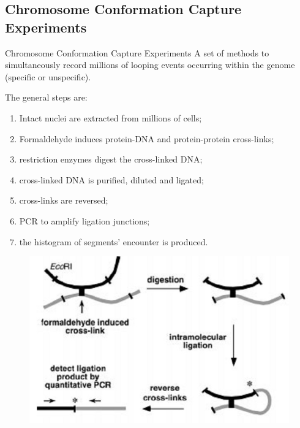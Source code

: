\documentclass[8pt]{beamer}
\begin{document}
\subsection{Chromosome Conformation Capture Experiments}\label{subsection_chromosomeConformationCaptureExperiments}
\begin{frame}{Chromosome Conformation Capture Experiments}
A set of methods to simultaneously record millions of looping events occurring within the genome (specific or unspecific). 

The general steps are:
\begin{enumerate}
\item Intact nuclei are extracted from millions of cells;
\item Formaldehyde induces protein-DNA and protein-protein cross-links;
\item restriction enzymes digest the cross-linked DNA;
\item cross-linked DNA is purified, diluted and ligated;
\item cross-links are reversed;
\item PCR to amplify ligation junctions;
\item the histogram of segments' encounter is produced.
\end{enumerate}
\begin{figure}[H]
\includegraphics[scale=0.3]{3Cschematic}
\end{figure}
\end{frame}
\end{document}
